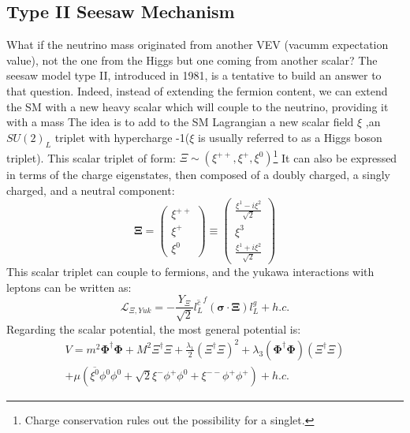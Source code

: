 \subsection{Type II Seesaw Mechanism}
What if the neutrino mass originated from another VEV (vacumm expectation value), not the one from the Higgs but one coming from another scalar? The seesaw model type II, introduced in 1981\cite{type3seesaw}, is a tentative to build an answer to that question. Indeed, instead
of extending the fermion content, we can extend the SM with a new heavy scalar which will couple to the neutrino, providing it with a mass
The idea is to add to the SM Lagrangian a new scalar field \(\xi\) ,an $SU(2)_L$ triplet with hypercharge -1($\xi$ is usually referred to as a Higgs boson triplet). This scalar triplet of form: $\Xi \sim \left(\xi ^{++}, \xi ^{+} ,\xi^{0}\right)$\footnote{Charge conservation rules out the possibility for a singlet.} It can also be expressed in terms of the charge eigenstates, then composed of a doubly charged, a singly charged, and a neutral component:
\begin{equation}
    \bm{\Xi} = \begin{pmatrix}
        \xi ^{++} \\ \xi ^{+} \\\xi^{0}
    \end{pmatrix} \equiv \begin{pmatrix}
        \frac{\xi^{1} - i \xi ^{2}}{\sqrt{2}} \\ \xi^{3} \\
        \frac{\xi^{1} + i \xi ^{2}}{\sqrt{2}}
    \end{pmatrix} 
\end{equation}
This scalar triplet can couple to fermions, and the yukawa interactions with leptons can be written as:
\begin{equation}
    \mathcal{L}_{\Xi, Yuk} = - \frac{Y_{\Xi}}{\sqrt{2}} \overline{l^c _L}^f (\bm{\sigma}
    \cdot\bm{\Xi}) l_L ^g + h.c.
\end{equation}
Regarding the scalar potential, the most general potential is\cite{bouchandthesis}:
\begin{equation}
   \begin{gathered}
       V = m^2 \bm{\Phi}^\dagger \bm{\Phi} + M^2 \Xi^\dagger \Xi + \frac{\lambda_1}{2}(\Xi^\dagger \Xi)^2 + \lambda _3 (\bm{\Phi}^\dagger \bm{\Phi})(\Xi^\dagger \Xi) \\+ \mu \left(
        \overline{\xi^{0}} \phi^0 \phi^0 + \sqrt{2}\xi^{-}\phi^{+}\phi^{0} + \xi^{--}\phi^{+}\phi^{+}\right) 
        + h.c.
   \end{gathered}
\end{equation}
